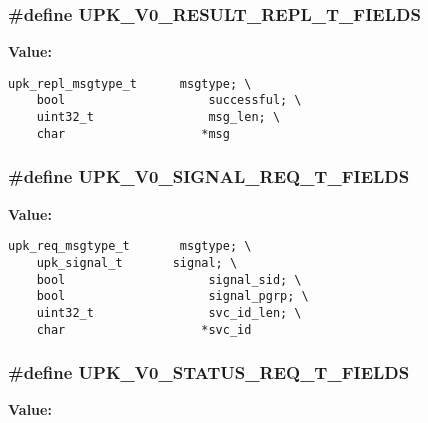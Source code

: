 \subsubsection{\setlength{\rightskip}{0pt plus 5cm}\#define UPK\_\-V0\_\-RESULT\_\-REPL\_\-T\_\-FIELDS}\label{v0__protocol__structs_8h_638995847106e9e51965bd1f4a63ff2a}


\textbf{Value:}

\begin{Code}\begin{verbatim}upk_repl_msgtype_t      msgtype; \
    bool                    successful; \
    uint32_t                msg_len; \
    char                   *msg
\end{verbatim}\end{Code}
\subsubsection{\setlength{\rightskip}{0pt plus 5cm}\#define UPK\_\-V0\_\-SIGNAL\_\-REQ\_\-T\_\-FIELDS}\label{v0__protocol__structs_8h_ba4b6944cd4029c39a0b3e72f13415bc}


\textbf{Value:}

\begin{Code}\begin{verbatim}upk_req_msgtype_t       msgtype; \
    upk_signal_t       signal; \
    bool                    signal_sid; \
    bool                    signal_pgrp; \
    uint32_t                svc_id_len; \
    char                   *svc_id
\end{verbatim}\end{Code}
\subsubsection{\setlength{\rightskip}{0pt plus 5cm}\#define UPK\_\-V0\_\-STATUS\_\-REQ\_\-T\_\-FIELDS}\label{v0__protocol__structs_8h_92e2c3ae3ec30885465a26dd0e73c7fe}


\textbf{Value:}

